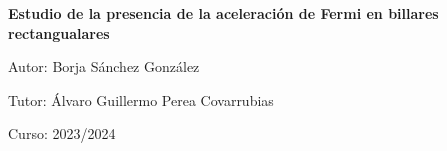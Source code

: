\begin{titlepage}
\begin{center}
        \vspace{10mm}

        \textbf{\Huge Estudio de la presencia de la aceleración de Fermi en billares rectangualares}

        \vspace{10mm}

        \LARGE Autor: Borja Sánchez González
        
        \LARGE Tutor: Álvaro Guillermo Perea Covarrubias

        \vspace{20mm}

        \LARGE Curso: 2023/2024
             
    \end{center}
 \end{titlepage}

%